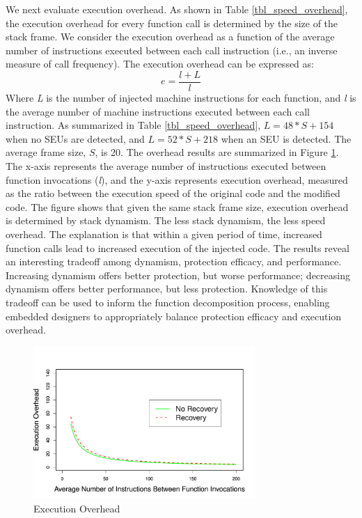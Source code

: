 We next evaluate execution overhead. As shown in Table \ref{tbl_speed_overhead}, the execution overhead for every function call is determined by the size of the stack frame. We consider the execution overhead as a function of the average number of instructions executed between each call instruction (i.e., an inverse measure of call frequency). The execution overhead can be expressed as:
\begin{equation}\label{eq_seu1}
e=\frac{l+L}{l}
\end{equation}
Where \textit{L} is the number of injected machine instructions for each function, and \textit{l} is the average number of machine instructions executed between each call instruction. As summarized in Table \ref{tbl_speed_overhead}, $L=48*S+154$ when no SEUs are detected, and $L=52*S+218$ when an SEU is detected. The average frame size, $S$, is 20. The overhead results are summarized in Figure \ref{fig:speed_overhead}. The x-axis represents the average number of instructions executed between function invocations (\textit{l}), and the y-axis represents execution overhead, measured as the ratio between the execution speed of the original code and the modified code. The figure shows that given the same stack frame size, execution overhead is determined by stack dynamism. The less stack dynamism, the less speed overhead. The explanation is that within a given period of time, increased function calls lead to increased execution of the injected code. The results reveal an interesting tradeoff among dynamism, protection efficacy, and performance. Increasing dynamism offers better protection, but worse performance; decreasing dynamism offers better performance, but less protection. Knowledge of this tradeoff can be used to inform the function decomposition process, enabling embedded designers to appropriately balance protection efficacy and execution overhead.
\begin{figure}[h]
	\centering
	\includegraphics[width=0.75\textwidth]{figures/speed_overhead_line_chart_v1.pdf}
	\vspace{5pt}
	\caption{Execution Overhead}
	\label{fig:speed_overhead}
\end{figure}
